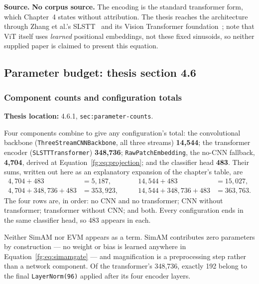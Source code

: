 \documentclass[11pt,a4paper]{article}
\numberwithin{equation}{section}
\begin{document}
\textbf{Source.} \textbf{No corpus source.} The encoding is the standard
transformer form, which Chapter~4 states without attribution. The thesis
reaches the architecture through Zhang et al.'s SLSTT~\cite{zhang2022} and its
Vision Transformer foundation~\cite{dosovitskiy2021}; note that ViT itself
uses \emph{learned} positional embeddings, not these fixed sinusoids, so
neither supplied paper is claimed to present this equation.

\subsection{Parameter budget: thesis section 4.6}

\subsubsection{Component counts and configuration totals}
\label{fg:param-totals}
\textbf{Thesis location:} 4.6.1, \texttt{sec:parameter-counts}.

Four components combine to give any configuration's total: the convolutional
backbone (\texttt{ThreeStreamCNNBackbone}, all three streams)
\textbf{14,544}; the transformer encoder (\texttt{SLSTTTransformer})
\textbf{348,736}; \texttt{RawPatchEmbedding}, the no-CNN fallback,
\textbf{4,704}, derived at Equation~\eqref{fg:eq:projection}; and the
classifier head \textbf{483}. Their sums, written out here as an explanatory
expansion of the chapter's table, are
\begin{equation}
\begin{aligned}
    4{,}704+483&=5{,}187, &\qquad 14{,}544+483&=15{,}027,\\
    4{,}704+348{,}736+483&=353{,}923, &\qquad
    14{,}544+348{,}736+483&=363{,}763.
\end{aligned}
    \label{fg:eq:param-totals}
\end{equation}
The four rows are, in order: no CNN and no transformer; CNN without
transformer; transformer without CNN; and both. Every configuration ends in
the same classifier head, so 483 appears in each.

Neither SimAM nor EVM appears as a term. SimAM contributes zero parameters by
construction --- no weight or bias is learned anywhere in
Equation~\eqref{fg:eq:simamgate} --- and magnification is a preprocessing step
rather than a network component. Of the transformer's 348,736, exactly 192
belong to the final \texttt{LayerNorm(96)} applied after its four encoder
layers.
\end{document}
